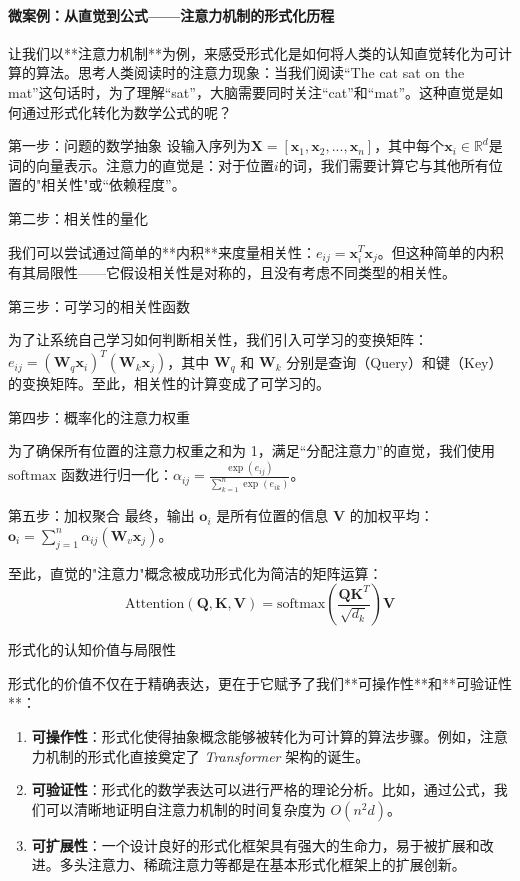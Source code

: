 \paragraph{微案例：从直觉到公式——注意力机制的形式化历程}

让我们以**注意力机制**为例，来感受形式化是如何将人类的认知直觉转化为可计算的算法。思考人类阅读时的注意力现象：当我们阅读“The cat sat on the mat”这句话时，为了理解“sat”，大脑需要同时关注“cat”和“mat”。这种直觉是如何通过形式化转化为数学公式的呢？

第一步：问题的数学抽象
设输入序列为$\mathbf{X} = [\mathbf{x}_1, \mathbf{x}_2, ..., \mathbf{x}_n]$，其中每个$\mathbf{x}_i \in \mathbb{R}^d$是词的向量表示。注意力的直觉是：对于位置$i$的词，我们需要计算它与其他所有位置的"相关性"或“依赖程度”。

第二步：相关性的量化

我们可以尝试通过简单的**内积**来度量相关性：$e_{ij} = \mathbf{x}_i^T \mathbf{x}_j$。但这种简单的内积有其局限性——它假设相关性是对称的，且没有考虑不同类型的相关性。

第三步：可学习的相关性函数

为了让系统自己学习如何判断相关性，我们引入可学习的变换矩阵：$e_{ij} = (\mathbf{W}_q \mathbf{x}_i)^T (\mathbf{W}_k \mathbf{x}_j)$，其中 $\mathbf{W}_q$ 和 $\mathbf{W}_k$ 分别是查询（Query）和键（Key）的变换矩阵。至此，相关性的计算变成了可学习的。

第四步：概率化的注意力权重

为了确保所有位置的注意力权重之和为 1，满足“分配注意力”的直觉，我们使用 $\text{softmax}$ 函数进行归一化：$\alpha_{ij} = \frac{\exp(e_{ij})}{\sum_{k=1}^{n} \exp(e_{ik})}$。

第五步：加权聚合
最终，输出 $\mathbf{o}_i$ 是所有位置的信息 $\mathbf{V}$ 的加权平均：$\mathbf{o}_i = \sum_{j=1}^{n} \alpha_{ij} (\mathbf{W}_v \mathbf{x}_j)$。

至此，直觉的"注意力"概念被成功形式化为简洁的矩阵运算：
$$\text{Attention}(\mathbf{Q}, \mathbf{K}, \mathbf{V}) = \text{softmax}\left(\frac{\mathbf{Q}\mathbf{K}^T}{\sqrt{d_k}}\right)\mathbf{V}$$

形式化的认知价值与局限性

形式化的价值不仅在于精确表达，更在于它赋予了我们**可操作性**和**可验证性**：

\begin{enumerate}
\item \textbf{可操作性}：形式化使得抽象概念能够被转化为可计算的算法步骤。例如，注意力机制的形式化直接奠定了 \textit{Transformer} 架构的诞生。
\item \textbf{可验证性}：形式化的数学表达可以进行严格的理论分析。比如，通过公式，我们可以清晰地证明自注意力机制的时间复杂度为 $O(n^2 d)$。
\item \textbf{可扩展性}：一个设计良好的形式化框架具有强大的生命力，易于被扩展和改进。多头注意力、稀疏注意力等都是在基本形式化框架上的扩展创新。
\end{enumerate}

